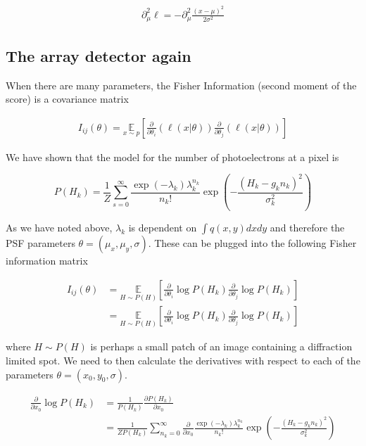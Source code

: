 \documentclass{article}
\begin{document}
\begin{align*}
\partial_{\mu}^{2}\ell = -\partial_{\mu}^{2}\frac{(x-\mu)^{2}}{2\sigma^{2}}
\end{align*}

\subsection{The array detector again}

When there are many parameters, the Fisher Information (second moment of the score) is a covariance matrix

\begin{align*}
I_{ij}(\theta) = \underset{{x\sim p}}{\mathbb{E}}\left[\frac{\partial}{\partial\theta_{i}} \left(\ell(x|\theta)\right)\frac{\partial}{\partial\theta_{j}} \left(\ell(x|\theta)\right)\right]
\end{align*}

We have shown that the model for the number of photoelectrons at a pixel is

\begin{equation*}
P(H_{k}) = \frac{1}{Z}\sum_{s=0}^{\infty}\frac{\exp\left({-\lambda_{k}}\right)\lambda_{k}^{n_{k}}}{n_{k}!}\exp\left(-\frac{(H_{k}-g_{k}n_{k})^{2}}{\sigma_{k}^{2}}\right)
\end{equation*}

As we have noted above, $\lambda_{k}$ is dependent on $\int q(x,y)dxdy$ and therefore the PSF parameters $\theta = (\mu_{x},\mu_{y},\sigma)$. These can be plugged into the following Fisher information matrix

\begin{align*}
I_{ij}(\theta) &= \underset{{H\sim P(H)}}{\mathbb{E}}\left[\frac{\partial}{\partial\theta_{i}} \log P(H_{k})\frac{\partial}{\partial\theta_{j}} \log P(H_{k})\right]\\
&= \underset{{H\sim P(H)}}{\mathbb{E}}\left[\frac{\partial}{\partial\theta_{i}} \log P(H_{k})\frac{\partial}{\partial\theta_{j}}\log P(H_{k})\right]
\end{align*}

where $H\sim P(H)$ is perhaps a small patch of an image containing a diffraction limited spot. We need to then calculate the derivatives with respect to each of the parameters $\theta = (x_{0},y_{0},\sigma)$. 

\begin{align*}
\frac{\partial}{\partial x_{0}}\log P(H_{k}) &= \frac{1}{P(H_{k})} \frac{\partial P(H_{k})}{\partial x_{0}}\\
&=  \frac{1}{ZP(H_{k})}\sum_{n_{k}=0}^{\infty}\frac{\partial}{\partial x_{0}}\frac{\exp\left({-\lambda_{k}}\right)\lambda_{k}^{n_{k}}}{n_{k}!}\exp\left(-\frac{(H_{k}-g_{k}n_{k})^{2}}{\sigma_{k}^{2}}\right)\\
\end{align*}
\end{document}
